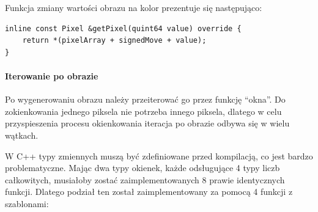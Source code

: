 \par
Funkcja zmiany wartości obrazu na kolor prezentuje się następująco:
\begin{lstlisting}
inline const Pixel &getPixel(quint64 value) override {
    return *(pixelArray + signedMove + value);
}
\end{lstlisting}

\paragraph{Iterowanie po obrazie}
\par
Po wygenerowaniu obrazu należy przeiterować go przez funkcję \enquote{okna}.
Do zokienkowania jednego piksela nie potrzeba innego piksela, dlatego w celu przyspieszenia procesu okienkowania iteracja po obrazie odbywa się w wielu wątkach.
\par
W C++ typy zmiennych muszą być zdefiniowane przed kompilacją, co jest bardzo problematyczne.
Mając dwa typy okienek, każde odsługujące 4 typy liczb całkowitych, musiałoby zostać zaimplementowanych 8 prawie identycznych funkcji.
Dlatego podział ten został zaimplementowany za pomocą 4 funkcji z szablonami:
